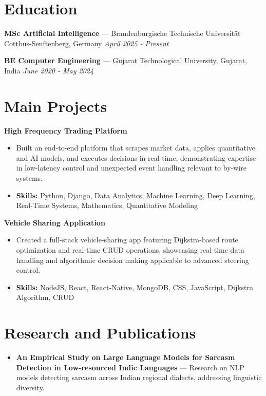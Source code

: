 \documentclass[a4paper,10pt]{article}
\begin{document}
\section*{Education}
\textbf{MSc Artificial Intelligence} — Brandenburgische Technische Universität Cottbus-Senftenberg, Germany \hfill \textit{April 2025 - Present}\par
\vspace{1.5pt}
\textbf{BE Computer Engineering} — Gujarat Technological University, Gujarat, India \hfill \textit{June 2020 - May 2024}\par

\section*{Main Projects}
\textbf{High Frequency Trading Platform}\par
\vspace{1pt}
\begin{itemize}
  \item Built an end-to-end platform that scrapes market data, applies quantitative and AI models, and executes decisions in real time, demonstrating expertise in low-latency control and unexpected event handling relevant to by-wire systems.
  \item \textbf{Skills:} Python, Django, Data Analytics, Machine Learning, Deep Learning, Real-Time Systems, Mathematics, Quantitative Modeling
\end{itemize}
\vspace{3pt}
\textbf{Vehicle Sharing Application}\par
\vspace{1pt}
\begin{itemize}
  \item Created a full-stack vehicle-sharing app featuring Dijkstra-based route optimization and real-time CRUD operations, showcasing real-time data handling and algorithmic decision making applicable to advanced steering control.
  \item \textbf{Skills:} NodeJS, React, React-Native, MongoDB, CSS, JavaScript, Dijkstra Algorithm, CRUD
\end{itemize}

\section*{Research and Publications}
\begin{itemize}
\item \textbf{An Empirical Study on Large Language Models for Sarcasm Detection in Low-resourced Indic Languages} — Research on NLP models detecting sarcasm across Indian regional dialects, addressing linguistic diversity.
\end{itemize}
\end{document}
